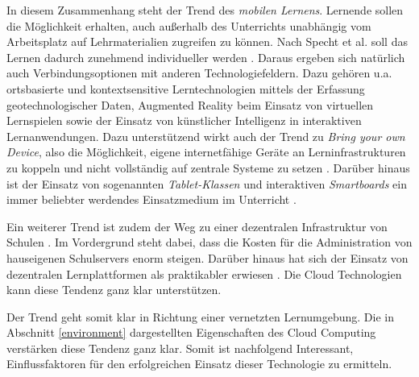 In diesem Zusammenhang steht der Trend des \textit{mobilen Lernens}. Lernende sollen die Möglichkeit erhalten, auch außerhalb des Unterrichts unabhängig vom Arbeitsplatz auf Lehrmaterialien zugreifen zu können. Nach Specht et al. soll das Lernen dadurch zunehmend individueller werden \cite{specht}. Daraus ergeben sich natürlich auch Verbindungsoptionen mit anderen Technologiefeldern. Dazu gehören u.a. ortsbasierte und kontextsensitive Lerntechnologien mittels der Erfassung geotechnologischer Daten, Augmented Reality beim Einsatz von virtuellen Lernspielen sowie der Einsatz von künstlicher Intelligenz in interaktiven Lernanwendungen. Dazu unterstützend wirkt auch der Trend zu \textit{Bring your own Device}, also die Möglichkeit, eigene internetfähige Geräte an Lerninfrastrukturen zu koppeln und nicht vollständig auf zentrale Systeme zu setzen \cite{scheiter} \cite{meinel2}. Darüber hinaus ist der Einsatz von sogenannten \textit{Tablet-Klassen} und interaktiven \textit{Smartboards} ein immer beliebter werdendes Einsatzmedium im Unterricht \cite{kerres}.

Ein weiterer Trend ist zudem der Weg zu einer dezentralen Infrastruktur von Schulen \cite{breiter}. Im Vordergrund steht dabei, dass die Kosten für die Administration von hauseigenen Schulservers enorm steigen. Darüber hinaus hat sich der Einsatz von dezentralen Lernplattformen als praktikabler erwiesen \cite{breiter}. Die Cloud Technologien kann diese Tendenz ganz klar unterstützen.

Der Trend geht somit klar in Richtung einer vernetzten Lernumgebung. Die in Abschnitt \ref{environment} dargestellten Eigenschaften des Cloud Computing verstärken diese Tendenz ganz klar. Somit ist nachfolgend Interessant, Einflussfaktoren für den erfolgreichen Einsatz dieser Technologie zu ermitteln.